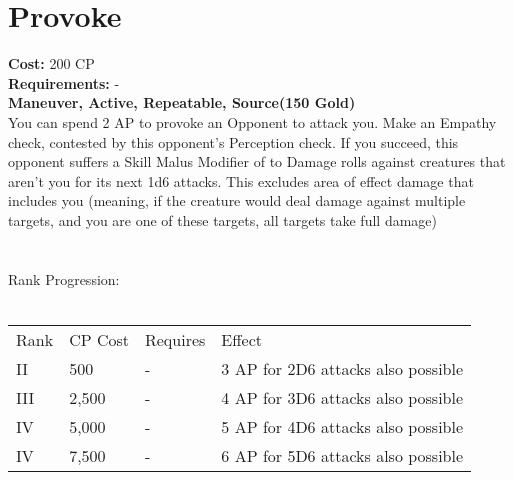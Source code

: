 \section{Provoke}\label{maneuver:provoke}
\textbf{Cost:} 200 CP\\
\textbf{Requirements:} -\\
\textbf{Maneuver, Active, Repeatable, Source(150 Gold)}\\
You can spend 2 AP to provoke an Opponent to attack you.
Make an Empathy check, contested by this opponent's Perception check.
If you succeed, this opponent suffers a Skill Malus Modifier of  to Damage rolls against creatures that aren't you for its next 1d6 attacks.
This excludes area of effect damage that includes you (meaning, if the creature would deal damage against multiple targets, and you are one of these targets, all targets take full damage)\\
\\
\\
Rank Progression:\\
\\
\begin{tabular}{l | l | l | l}
	Rank & CP Cost & Requires & Effect\\
	II & 500 & - & 3 AP for 2D6 attacks also possible\\
	III & 2,500 & - & 4 AP for 3D6 attacks also possible\\
	IV & 5,000 & - & 5 AP for 4D6 attacks also possible\\
	IV & 7,500 & - & 6 AP for 5D6 attacks also possible\\
\end{tabular}